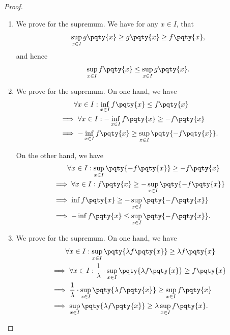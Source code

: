 \begin{proof}
    \begin{enumerate}
        \item We prove for the supremum. We have for any \(x \in I\), that
        \[
            \sup_{x \in I} g\pqty{x} \geq g\pqty{x} \geq f\pqty{x},
        \]
        and hence
        \[
            \sup_{x \in I} f\pqty{x} \leq \sup_{x \in I} g\pqty{x}.
        \]

        \item We prove for the supremum. On one hand, we have
        \begin{align*}
            &\phantom{\implies} \forall x \in I: \inf_{x \in I} f\pqty{x} \leq f\pqty{x} \\
            &\implies \forall x \in I: - \inf_{x \in I} f\pqty{x} \geq -f\pqty{x} \\
            &\implies - \inf_{x \in I} f\pqty{x} \geq \sup_{x \in I} \pqty{- f\pqty{x}}.
        \end{align*}

        On the other hand, we have
        \begin{align*}
            &\phantom{\implies} \forall x \in I: \sup_{x \in I} \pqty{- f\pqty{x}} \geq -f\pqty{x} \\
            &\implies \forall x \in I: f\pqty{x} \geq -\sup_{x \in I} \pqty{- f\pqty{x}}  \\
            &\implies \inf f\pqty{x} \geq - \sup_{x \in I} \pqty{- f\pqty{x}} \\
            &\implies - \inf f\pqty{x} \leq \sup_{x \in I} \pqty{- f\pqty{x}}.
        \end{align*}

        \item We prove for the supremum. On one hand, we have
        \begin{align*}
            &\phantom{\implies} \forall x \in I: \sup_{x \in I} \pqty{\lambda f\pqty{x}} \geq \lambda f\pqty{x} \\
            &\implies \forall x \in I: \frac{1}{\lambda} \cdot \sup_{x \in I} \pqty{\lambda f\pqty{x}} \geq f\pqty{x} \\
            &\implies \frac{1}{\lambda} \cdot \sup_{x \in I} \pqty{\lambda f\pqty{x}} \geq \sup_{x \in I} f\pqty{x} \\
            &\implies \sup_{x \in I} \pqty{\lambda f\pqty{x}} \geq \lambda \sup_{x \in I} f\pqty{x}.
        \end{align*}


\end{enumerate}
\end{proof}
